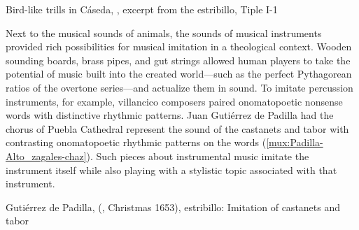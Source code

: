 {Bird-like trills in Cáseda, , excerpt from the
estribillo, Tiple I-1}

Next to the musical sounds of animals, the sounds of musical instruments
provided rich possibilities for musical imitation in a theological context.
Wooden sounding boards, brass pipes, and gut strings allowed human players to
take the potential of music built into the created world---such as the perfect
Pythagorean ratios of the overtone series---and actualize them in sound.
To imitate percussion instruments, for example, villancico composers paired
onomatopoetic nonsense words with distinctive rhythmic patterns.
Juan Gutiérrez de Padilla had the chorus of Puebla Cathedral represent the
sound of the castanets and tabor with contrasting onomatopoetic rhythmic
patterns on the words  (\cref{mux:Padilla-Alto_zagales-chaz}).
Such pieces about instrumental music imitate the instrument itself while also
playing with a stylistic topic associated with that instrument.

{Gutiérrez de Padilla, 
(, Christmas 1653), estribillo: Imitation of castanets
and tabor}

